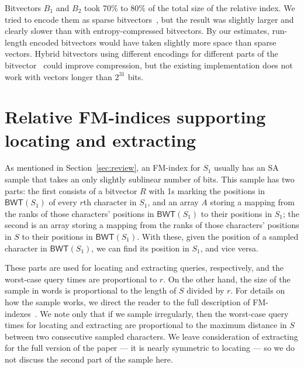 \documentclass{llncs}
\newcommand{\BWT}
  {\ensuremath{\mathsf{BWT}}}
\begin{document}
Bitvectors $B_{1}$ and $B_{2}$ took 70\% to 80\% of the total size of the
relative index. We tried to encode them as sparse
bitvectors~\cite{Okanohara2007}, but the result was slightly larger and
clearly slower than with entropy-compressed bitvectors. By our estimates,
run-length encoded bitvectors would have taken slightly more space than
sparse vectors. Hybrid bitvectors using different encodings for different
parts of the bitvector~\cite{Kaerkkaeinen2014} could improve compression, but
the existing implementation does not work with vectors longer than $2^{31}$
bits.





\section{Relative FM-indices supporting locating and extracting}
\label{sec:djamal&giovanni}


As mentioned in Section~\ref{sec:review}, an FM-index for $S_1$ usually has
an SA sample that takes an only slightly sublinear number of bits.  This
sample has two parts: the first consists of a bitvector $R$ with 1s marking
the positions in \(\BWT (S_1)\) of every $r$th character in $S_1$, and an
array $A$ storing a mapping from the ranks of those characters' positions in
\(\BWT (S_1)\) to their positions in $S_1$; the second is an array storing a
mapping from the ranks of those characters' positions in $S$ to their
positions in \(\BWT (S_1)\).  With these, given the position of a sampled
character in \(\BWT (S_1)\), we can find its position in $S_1$, and vice
versa.

These parts are used for locating and extracting queries, respectively, and
the worst-case query times are proportional to $r$.  On the other hand, the
size of the sample in words is proportional to the length of $S$ divided by
$r$.  For details on how the sample works, we direct the reader to the full
description of FM-indexes~\cite{FM05}.  We note only that if we sample
irregularly, then the worst-case query times for locating and extracting are
proportional to the maximum distance in $S$ between two consecutive sampled
characters.  We leave consideration of extracting for the full version of the
paper --- it is nearly symmetric to locating --- so we do not discuss the
second part of the sample here.
\end{document}
